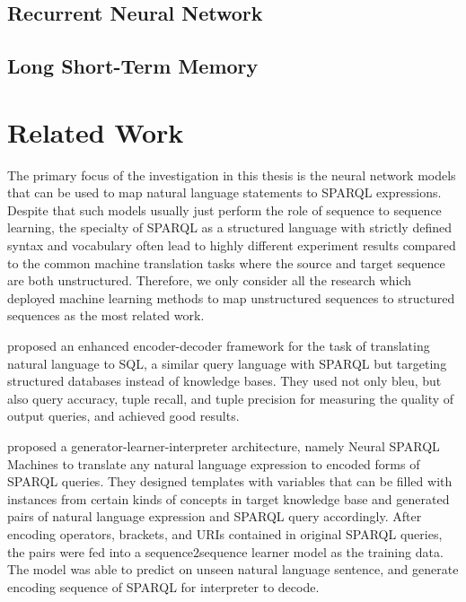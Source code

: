 \subsection{Recurrent Neural Network}


\subsection{Long Short-Term Memory}


\section{Related Work} \label{section:related work}

The primary focus of the investigation in this thesis is the neural network models that can be used to map natural language statements to SPARQL expressions. Despite that such models usually just perform the role of sequence to sequence learning, the specialty of SPARQL as a structured language with strictly defined syntax and vocabulary often lead to highly different experiment results compared to the common machine translation tasks where the source and target sequence are both unstructured. Therefore, we only consider all the research which deployed machine learning methods to map unstructured sequences to structured sequences as the most related work.

\cite{Cai2017} proposed an enhanced encoder-decoder framework for the task of translating natural language to SQL, a similar query language with SPARQL but targeting structured databases instead of knowledge bases. They used not only bleu, but also query accuracy, tuple recall, and tuple precision for measuring the quality of output queries, and achieved good results.

\cite{Soru2018a,Soru2018} proposed a generator-learner-interpreter architecture, namely Neural SPARQL Machines to translate any natural language expression to encoded forms of SPARQL queries. They designed templates with variables that can be filled with instances from certain kinds of concepts in target knowledge base and generated pairs of natural language expression and SPARQL query accordingly. After encoding operators, brackets, and URIs contained in original SPARQL queries, the pairs were fed into a sequence2sequence learner model as the training data. The model was able to predict on unseen natural language sentence, and generate encoding sequence of SPARQL for interpreter to decode. 